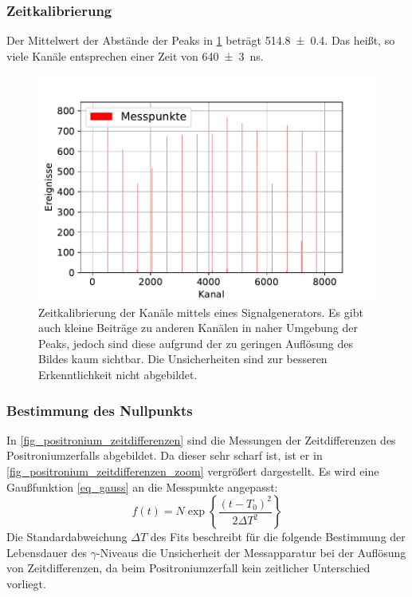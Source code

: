 \documentclass[
	a4paper,
	12pt,
	pagesize,
	ngerman
]{scrartcl}
\begin{document}
  \subsubsection{Zeitkalibrierung}\label{sss_zeitkali}
	Der Mittelwert der Abstände der Peaks in \cref{fig_zeitkalibrierung} beträgt \SI{514.8+-0.4}{}. Das heißt, so viele Kanäle entsprechen einer Zeit von \SI{640+-3}{ns}.

	\begin{figure}[H]
				\includegraphics[width= 0.9 \linewidth]{img/Zeitkalibrierung}
				\caption{
				Zeitkalibrierung der Kanäle mittels eines Signalgenerators.
				Es gibt auch kleine Beiträge zu anderen Kanälen in naher Umgebung der Peaks, jedoch sind diese aufgrund der zu geringen Auflösung des Bildes kaum sichtbar.
				Die Unsicherheiten sind zur besseren Erkenntlichkeit nicht abgebildet.
				}
				\label{fig_zeitkalibrierung}
		\end{figure}

		\subsubsection{Bestimmung des Nullpunkts}
		In \cref{fig_positronium_zeitdifferenzen} sind die Messungen der Zeitdifferenzen des Positroniumzerfalls abgebildet.
		Da dieser sehr scharf ist, ist er in \cref{fig_positronium_zeitdifferenzen_zoom} vergrößert dargestellt.
		Es wird eine Gaußfunktion \ref{eq_gauss} an die Messpunkte angepasst:
		\begin{equation}
			\label{eq_gauss}
			 f(t) = N\exp\left\{{\frac{(t-T_0)^2}{2 \Delta T^2}}\right\}
		\end{equation}
		Die Standardabweichung $\Delta T$ des Fits beschreibt für die folgende Bestimmung der Lebensdauer des $\gamma$-Niveaus die Unsicherheit der Messapparatur bei der Auflösung von Zeitdifferenzen, da beim Positroniumzerfall kein zeitlicher Unterschied vorliegt. %
\end{document}
